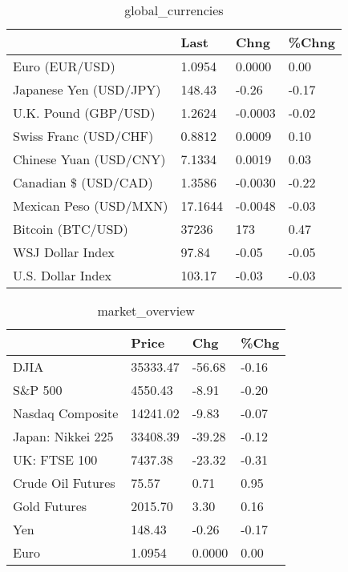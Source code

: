 \documentclass{article}%
\begin{document}
%


\begin{table}[htbp]%
\caption{global\_currencies}%
\centering%
\begin{adjustbox}{width=1\textwidth}%
\begin{tabular}{llll}
\toprule
                       &    Last &    Chng & \%Chng \\
\midrule
        Euro (EUR/USD) &  1.0954 &  0.0000 &  0.00 \\
Japanese Yen (USD/JPY) &  148.43 &   -0.26 & -0.17 \\
  U.K. Pound (GBP/USD) &  1.2624 & -0.0003 & -0.02 \\
 Swiss Franc (USD/CHF) &  0.8812 &  0.0009 &  0.10 \\
Chinese Yuan (USD/CNY) &  7.1334 &  0.0019 &  0.03 \\
  Canadian \$ (USD/CAD) &  1.3586 & -0.0030 & -0.22 \\
Mexican Peso (USD/MXN) & 17.1644 & -0.0048 & -0.03 \\
     Bitcoin (BTC/USD) &   37236 &     173 &  0.47 \\
      WSJ Dollar Index &   97.84 &   -0.05 & -0.05 \\
     U.S. Dollar Index &  103.17 &   -0.03 & -0.03 \\
\bottomrule
\end{tabular}
%
\end{adjustbox}%
\end{table}

%


\begin{table}[htbp]%
\caption{market\_overview}%
\centering%
\begin{adjustbox}{width=1\textwidth}%
\begin{tabular}{llll}
\toprule
                  &    Price &    Chg &  \%Chg \\
\midrule
             DJIA & 35333.47 & -56.68 & -0.16 \\
          S\&P 500 &  4550.43 &  -8.91 & -0.20 \\
 Nasdaq Composite & 14241.02 &  -9.83 & -0.07 \\
Japan: Nikkei 225 & 33408.39 & -39.28 & -0.12 \\
     UK: FTSE 100 &  7437.38 & -23.32 & -0.31 \\
Crude Oil Futures &    75.57 &   0.71 &  0.95 \\
     Gold Futures &  2015.70 &   3.30 &  0.16 \\
              Yen &   148.43 &  -0.26 & -0.17 \\
             Euro &   1.0954 & 0.0000 &  0.00 \\
\bottomrule
\end{tabular}
%
\end{adjustbox}%
\end{table}

%
\end{document}
